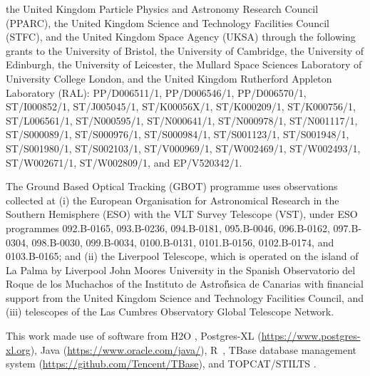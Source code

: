 the United Kingdom Particle Physics and Astronomy Research Council (PPARC), the United Kingdom Science and Technology Facilities Council (STFC), and the United Kingdom Space Agency (UKSA) through the following grants to the University of Bristol, the University of Cambridge, the University of Edinburgh, the University of Leicester, the Mullard Space Sciences Laboratory of University College London, and the United Kingdom Rutherford Appleton Laboratory (RAL): PP/D006511/1, PP/D006546/1, PP/D006570/1, ST/I000852/1, ST/J005045/1, ST/K00056X/1, ST/\-K000209/1, ST/K000756/1, ST/L006561/1, ST/N000595/1, ST/N000641/1, ST/N000978/1, ST/\-N001117/1, ST/S000089/1, ST/S000976/1, ST/S000984/1, ST/S001123/1, ST/S001948/1, ST/\-S001980/1, ST/S002103/1, ST/V000969/1, ST/W002469/1, ST/W002493/1, ST/W002671/1, ST/W002809/1, and EP/V520342/1.

The Ground Based Optical Tracking (GBOT) programme uses observations collected at (i) the European Organisation for Astronomical Research in the Southern Hemisphere (ESO) with the VLT Survey Telescope (VST), under ESO programmes
092.B-0165,
093.B-0236,
094.B-0181,
095.B-0046,
096.B-0162,
097.B-0304,
098.B-0030,
099.B-0034,
0100.B-0131,
0101.B-0156,
0102.B-0174, and
0103.B-0165;
and (ii) the Liverpool Telescope, which is operated on the island of La Palma by Liverpool John Moores University in the Spanish Observatorio del Roque de los Muchachos of the Instituto de Astrof\'{\i}sica de Canarias with financial support from the United Kingdom Science and Technology Facilities Council, and (iii) telescopes of the Las Cumbres Observatory Global Telescope Network.

This work made use of software from H2O \citep{h2o_platform}, Postgres-XL (\url{https://www.postgres-xl.org}), Java (\url{https://www.oracle.com/java/}), R~\citep{R-citation}, TBase database management system (\url{https://github.com/Tencent/TBase}), and TOPCAT/STILTS \citep{2005ASPC..347...29T}. %
